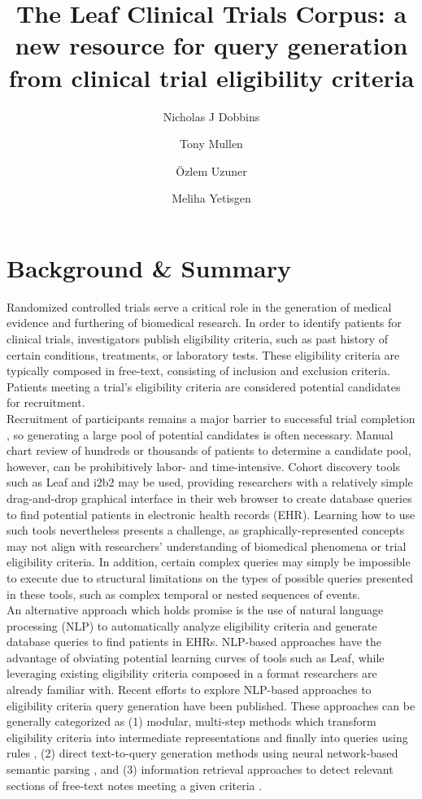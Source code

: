 \documentclass[fleqn,10pt]{wlscirep}
\title{The Leaf Clinical Trials Corpus: a new resource for query generation from clinical trial eligibility criteria}
\author[1,*]{Nicholas J Dobbins}
\author[2]{Tony Mullen}
\author[3]{Özlem Uzuner}
\author[1]{Meliha Yetisgen}
\affil[1]{Department of Biomedical Informatics \& Medical Education, University of Washington, Seattle, WA, USA}
\affil[2]{Khoury College of Computer Science, Northeastern University, Seattle, WA, USA}
\affil[3]{Department of Information Sciences and Technology, George Mason University, Fairfax, VA, USA}
\affil[*]{corresponding author(s): (ndobb@uw.edu)}
\begin{document}
\flushbottom
\maketitle

\section*{Background \& Summary}
\label{sec:background_and_summary}
\noindent Randomized controlled trials serve a critical role in the generation of medical evidence and furthering of biomedical research. In order to identify patients for clinical trials, investigators publish eligibility criteria, such as past history of certain conditions, treatments, or laboratory tests. These eligibility criteria are typically composed in free-text, consisting of inclusion and exclusion criteria. Patients meeting a trial's eligibility criteria are considered potential candidates for recruitment. \\

\noindent Recruitment of participants remains a major barrier to successful trial completion \cite{richesson2013electronic}, so generating a large pool of potential candidates is often necessary. Manual chart review of hundreds or thousands of patients to determine a candidate pool, however, can be prohibitively labor- and time-intensive. Cohort discovery tools such as Leaf \cite{dobbins2019leaf} and i2b2 \cite{murphy2010serving} may be used, providing researchers with a relatively simple drag-and-drop graphical interface in their web browser to create database queries to find potential patients in electronic health records (EHR). Learning how to use such tools nevertheless presents a challenge, as graphically-represented concepts may not align with researchers' understanding of biomedical phenomena or trial eligibility criteria. In addition, certain complex queries may simply be impossible to execute due to structural limitations on the types of possible queries presented in these tools, such as complex temporal or nested sequences of events. \\

\noindent An alternative approach which holds promise is the use of natural language processing (NLP) to automatically analyze eligibility criteria and generate database queries to find patients in EHRs. NLP-based approaches have the advantage of obviating potential learning curves of tools such as Leaf, while leveraging existing eligibility criteria composed in a format researchers are already familiar with. Recent efforts to explore NLP-based approaches to eligibility criteria query generation have been published. These approaches can be generally categorized as (1) modular, multi-step methods which transform eligibility criteria into intermediate representations and finally into queries using rules \cite{yuan2019criteria2query, wang2019translate, yu2020}, (2) direct text-to-query generation methods using neural network-based semantic parsing \cite{wang2019translate, yu2020}, and (3) information retrieval approaches to detect relevant sections of free-text notes meeting a given criteria \cite{koopman2016test, liu2020implementation, park2021framework, truong2022ittc}. \\
\end{document}

